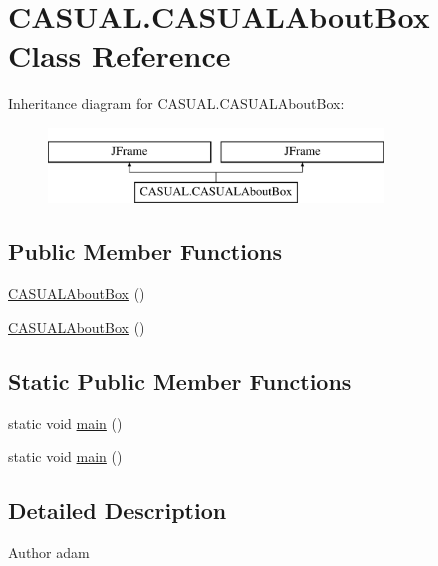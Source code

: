 \hypertarget{classCASUAL_1_1CASUALAboutBox}{\section{C\-A\-S\-U\-A\-L.\-C\-A\-S\-U\-A\-L\-About\-Box Class Reference}
\label{classCASUAL_1_1CASUALAboutBox}
}
Inheritance diagram for C\-A\-S\-U\-A\-L.\-C\-A\-S\-U\-A\-L\-About\-Box\-:\begin{figure}[H]
\begin{center}
\leavevmode
\includegraphics[height=2.000000cm]{classCASUAL_1_1CASUALAboutBox}
\end{center}
\end{figure}
\subsection*{Public Member Functions}
\begin{DoxyCompactItemize}
\item 
\hyperlink{classCASUAL_1_1CASUALAboutBox_a48d8d2dfc3dac07723d76f6e997296bd}{C\-A\-S\-U\-A\-L\-About\-Box} ()
\item 
\hyperlink{classCASUAL_1_1CASUALAboutBox_a48d8d2dfc3dac07723d76f6e997296bd}{C\-A\-S\-U\-A\-L\-About\-Box} ()
\end{DoxyCompactItemize}
\subsection*{Static Public Member Functions}
\begin{DoxyCompactItemize}
\item 
static void \hyperlink{classCASUAL_1_1CASUALAboutBox_a6cdc47b5b641579dc78c69ea028e56b0}{main} ()
\item 
static void \hyperlink{classCASUAL_1_1CASUALAboutBox_a6cdc47b5b641579dc78c69ea028e56b0}{main} ()
\end{DoxyCompactItemize}


\subsection{Detailed Description}
\begin{DoxyAuthor}{Author}
adam 
\end{DoxyAuthor}


